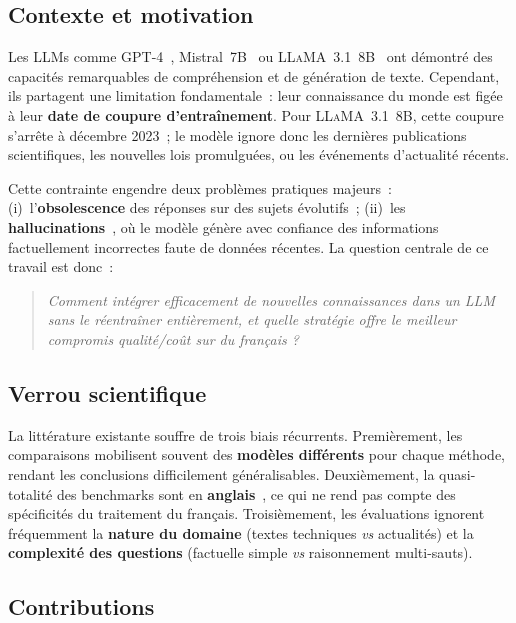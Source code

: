 \documentclass[10pt,journal,compsoc]{IEEEtran}
\begin{document}
\subsection{Contexte et motivation}

Les LLMs comme GPT-4~\cite{openai2023gpt4},
Mistral~7B~\cite{jiang2023mistral} ou
\textsc{LLaMA}~3.1~8B~\cite{meta2024llama3} ont démontré des capacités
remarquables de compréhension et de génération de texte. Cependant,
ils partagent une limitation fondamentale~: leur connaissance du monde
est figée à leur \textbf{date de coupure d'entraînement}. Pour
\textsc{LLaMA}~3.1~8B, cette coupure s'arrête à décembre 2023~; le
modèle ignore donc les dernières publications scientifiques, les
nouvelles lois promulguées, ou les événements d'actualité récents.

Cette contrainte engendre deux problèmes pratiques majeurs~:
(i)~l'\textbf{obsolescence} des réponses sur des sujets évolutifs~;
(ii)~les \textbf{hallucinations}~\cite{ji2023hallucination}, où le
modèle génère avec confiance des informations factuellement incorrectes
faute de données récentes. La question centrale de ce travail est donc~:

\begin{quote}
  \textit{Comment intégrer efficacement de nouvelles connaissances dans
  un LLM sans le réentraîner entièrement, et quelle stratégie offre le
  meilleur compromis qualité/coût sur du français ?}
\end{quote}

\subsection{Verrou scientifique}

La littérature existante souffre de trois biais récurrents. Premièrement,
les comparaisons mobilisent souvent des \textbf{modèles différents} pour
chaque méthode, rendant les conclusions difficilement généralisables.
Deuxièmement, la quasi-totalité des benchmarks sont en
\textbf{anglais}~\cite{rajpurkar2016squad}, ce qui ne rend pas compte
des spécificités du traitement du français. Troisièmement, les
évaluations ignorent fréquemment la \textbf{nature du domaine}
(textes techniques \textit{vs} actualités) et la \textbf{complexité des
questions} (factuelle simple \textit{vs} raisonnement multi-sauts).

\subsection{Contributions}
\end{document}
